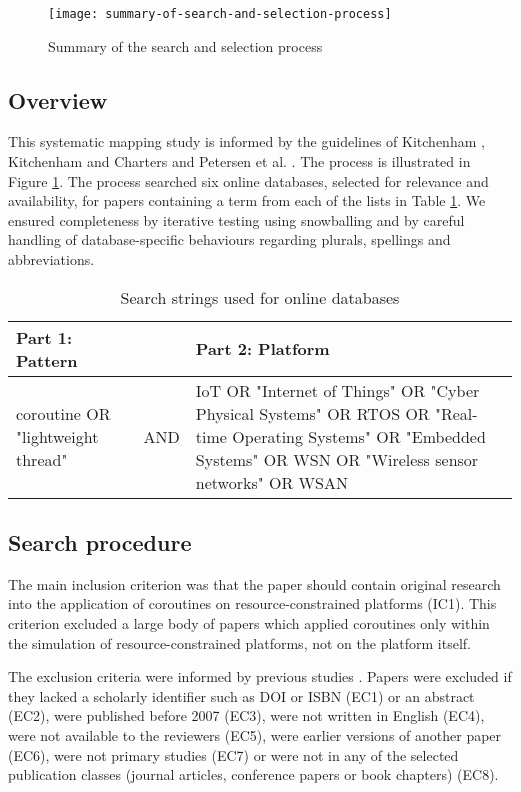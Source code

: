 \begin{figure}[h]
	\texttt{[image: summary-of-search-and-selection-process]}
	\caption{Summary of the search and selection process}
	\label{fig:sms}
\end{figure}

\subsection{Overview}

This systematic mapping study is informed by the guidelines of Kitchenham \cite{Kitchenham2004}, Kitchenham and Charters \cite{Kitchenham2007} and Petersen et al. \cite{Petersen2008}. The process is illustrated in Figure \ref{fig:sms}. The process searched six online databases, selected for relevance \cite{Brereton2007} and availability, for papers containing a term from each of the lists in Table \ref{table-databases}. We ensured completeness by iterative testing using snowballing \cite{Kitchenham2011a, Petersen2015} and by careful handling of database-specific behaviours regarding plurals, spellings and abbreviations.

\begin{table}[h]%
	\caption{Search strings used for online databases}
	\label{table-databases}
	\begin{tabular}{ p{4.5cm} c p{7cm} }
		\hline
		Part 1: Pattern & & Part 2: Platform\\
		\hline
		coroutine OR "lightweight thread" & AND & IoT OR "Internet of Things" OR "Cyber Physical Systems" OR RTOS OR "Real-time Operating Systems" OR "Embedded Systems" OR WSN OR "Wireless sensor networks" OR WSAN\\
		\hline
	\end{tabular}
\end{table}

\subsection{Search procedure}

The main inclusion criterion was that the paper should contain original research into the application of coroutines on resource-constrained platforms (IC1). This criterion excluded a large body of papers which applied coroutines only within the simulation of resource-constrained platforms, not on the platform itself.

The exclusion criteria were informed by previous studies \cite{Kitchenham2007, Petersen2008}. Papers were excluded if they lacked a scholarly identifier such as DOI or ISBN (EC1) or an abstract (EC2), were published before 2007 (EC3), were not written in English (EC4), were not available to the reviewers (EC5), were earlier versions of another paper (EC6), were not primary studies (EC7) or were not in any of the selected publication classes (journal articles, conference papers or book chapters) (EC8).

